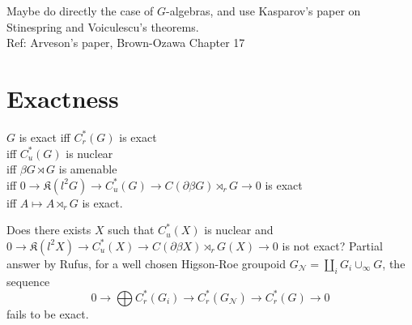 Maybe do directly the case of $G$-algebras, and use Kasparov's paper on Stinespring and Voiculescu's theorems.\\

Ref: Arveson's paper, Brown-Ozawa Chapter 17

\section{Exactness}
\begin{thm}
$G$ is exact iff $C^*_r(G)$ is exact \\
iff $C^*_u(G)$ is nuclear \\
iff $\beta G \rtimes G$ is amenable \\
iff $0\rightarrow \mathfrak K(l^2G) \rightarrow C^*_u(G) \rightarrow C(\partial \beta G )\rtimes_r G \rightarrow  0 $ is exact \\
iff $A\mapsto A\rtimes_r G$ is exact.\\
\end{thm}
Does there exists $X$ such that $C^*_u(X)$ is nuclear and $0\rightarrow \mathfrak K(l^2X) \rightarrow C^*_u(X) \rightarrow C(\partial \beta X )\rtimes_r G(X) \rightarrow  0 $ is not exact? Partial answer by Rufus, for a well chosen Higson-Roe groupoid $G_{\mathcal N} = \coprod_i G_i \cup_{\infty} G$, the sequence 
\[0\rightarrow \mathfrak \bigoplus C^*_r(G_i) \rightarrow C^*_r(G_{\mathcal N}) \rightarrow C^*_r (G) \rightarrow  0 \]
fails to be exact.
